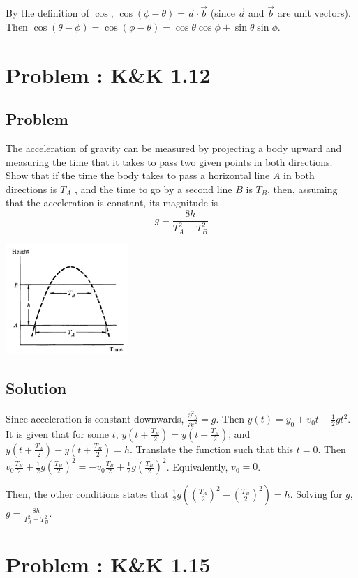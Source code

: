 \documentclass[solutions]{esg8012pset}
\begin{document}
  By the definition of $\cos$, $\cos(\phi - \theta) = \vec a \cdot \vec b$ (since $\vec a$ and $\vec b$ are unit vectors).  Then $\cos(\theta - \phi) = \cos(\phi - \theta) = \cos\theta\cos\phi + \sin\theta\sin\phi$.
\section{Problem \thesection: K\&K 1.12}
\subsection{Problem}
  The acceleration of gravity can be measured by projecting a body upward and measuring the
  time that it takes to pass two given points in both directions. Show that if the time the body takes
  to pass a horizontal line $A$ in both directions is $T_A$ , and the time to go by a second line $B$ is $T_B$,
  then, assuming that the acceleration is constant, its magnitude is
  $$g = \frac{8h}{T_A^2 - T_B^2}$$
  \begin{center}\includegraphics[width=0.35\textwidth]{ps01_1}\end{center}
\subsection{Solution}
  Since acceleration is constant downwards, $\frac{\partial^2 y}{\partial t^2} = g$.  Then $y(t) = y_0 + v_0 t + \frac{1}{2} g t^2$.  It is given that for some $t$, $y\left(t + \frac{T_B}{2}\right) = y\left(t - \frac{T_B}{2}\right)$, and $y\left(t + \frac{T_A}{2}\right) - y\left(t + \frac{T_B}{2}\right) = h$.  Translate the function such that this $t = 0$.  Then $v_0 \frac{T_B}{2} + \frac{1}{2} g \left(\frac{T_B}{2}\right)^2 = -v_0 \frac{T_B}{2} + \frac{1}{2} g \left(\frac{T_B}{2}\right)^2$.  Equivalently, $v_0 = 0$.

  Then, the other conditions states that $\frac{1}{2} g\left(\left(\frac{T_A}{2}\right)^2 - \left(\frac{T_B}{2}\right)^2\right) = h$.  Solving for $g$, $g = \frac{8h}{T_A^2 - T_B^2}$.
\section{Problem \thesection: K\&K 1.15}
\end{document}
